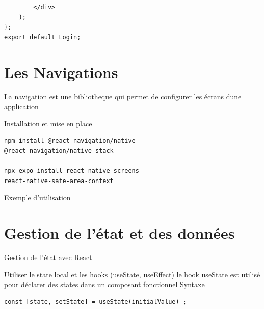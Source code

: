 \documentclass[5pt]{beamer}
\begin{document}
{\begin{frame}[fragile]{}
\begin{block}{}
\begin{verbatim}
        </div>
    );
};   
export default Login;

\end{verbatim}

\end{block}

\end{frame}



\section{Les Navigations}
\begin{frame}[fragile]{ }
\begin{block} {}
La navigation est une bibliotheque qui permet de configurer les
écrans dune application\end{block}
\end{frame}
\begin{frame}[fragile]{ Installation et mise en place}
\begin{block}{}
\begin{verbatim}
npm install @react-navigation/native 
@react-navigation/native-stack

npx expo install react-native-screens
react-native-safe-area-context
\end{verbatim}
\end{block}
\end{frame}
\begin{frame}[fragile]{ Exemple d'utilisation}
\begin{block}{ }

\end{block}

\end{frame}


\section{Gestion de l’état et des données}
\begin{frame}[fragile]{ Gestion de l’état avec React}
\begin{block} {Utiliser le state local et les hooks (useState, useEffect)}
le hook useState est utilisé pour déclarer des states dans un
composant fonctionnel
Syntaxe
\begin{verbatim}
const [state, setState] = useState(initialValue) ;


\end{verbatim}
\end{block}
\end{frame}}
\end{document}
